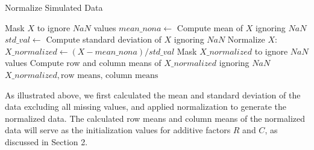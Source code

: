 \documentclass{article}
\begin{document}
\begin{algorithm}[H]
\caption{Normalize Simulated Data}
\begin{algorithmic}[1]
    \State Mask $X$ to ignore $NaN$ values
    \State $mean\_nona \gets$ Compute mean of $X$ ignoring $NaN$
    \State $std\_val \gets$ Compute standard deviation of $X$ ignoring $NaN$
    \State Normalize $X$: $X\_normalized \gets (X - mean\_nona) / std\_val$
    \State Mask $X\_normalized$ to ignore $NaN$ values
    \State Compute row and column means of $X\_normalized$ ignoring $NaN$
    \State \Return $X\_normalized, \text{row means, column means}$
\EndProcedure
\end{algorithmic}
\end{algorithm}

As illustrated above, we first calculated the mean and standard deviation of the data excluding all missing values, and applied normalization to generate the normalized data. The calculated row means and column means of the normalized data will serve as the initialization values for additive factors $R$ and $C$, as discussed in Section 2. 
\end{document}
